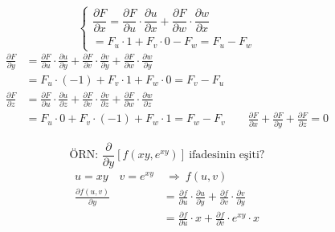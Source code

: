 \documentclass[11pt,a4paper]{article}
\begin{document}
\[ \left\{\begin{array}{l}\dfrac{\partial F}{\partial x}=\dfrac{\partial F}{\partial u}\cdot\dfrac{\partial u}{\partial x}+\dfrac{\partial F}{\partial w}\cdot\dfrac{\partial w}{\partial x}\\[3mm] =F_u\cdot1+F_v\cdot0-F_w=F_u-F_w\end{array}\right. \]
\begin{align*}
\frac{\partial F}{\partial y}&=\frac{\partial F}{\partial u}\cdot\frac{\partial u}{\partial y}+\frac{\partial F}{\partial v}\cdot\frac{\partial v}{\partial y}+\frac{\partial F}{\partial w}\cdot\frac{\partial w}{\partial y}\\
&=F_u\cdot(-1)+F_v\cdot1+F_w\cdot0=F_v-F_u\\
\frac{\partial F}{\partial z}&=\frac{\partial F}{\partial u}\cdot\frac{\partial u}{\partial z}+\frac{\partial F}{\partial v}\cdot\frac{\partial v}{\partial z}+\frac{\partial F}{\partial w}\cdot\frac{\partial w}{\partial z}\\
&=F_u\cdot0+F_v\cdot(-1)+F_w\cdot1=F_w-F_v\qquad\frac{\partial F}{\partial x}+\frac{\partial F}{\partial y}+\frac{\partial F}{\partial z}=0
\end{align*}

\[ \text{ÖRN: }\frac{\partial}{\partial y}\left[f(xy,e^{xy})\right]\ \text{ifadesinin eşiti?} \]
\begin{align*}
u=xy\quad v=e^{xy}&\ \Rightarrow\ f(u,v)\\
\frac{\partial f(u,v)}{\partial y}&=\frac{\partial f}{\partial u}\cdot\frac{\partial u}{\partial y}+\frac{\partial f}{\partial v}\cdot\frac{\partial v}{\partial y}\\
&=\frac{\partial f}{\partial u}\cdot x+\frac{\partial f}{\partial v}\cdot e^{xy}\cdot x
\end{align*}
\end{document}
